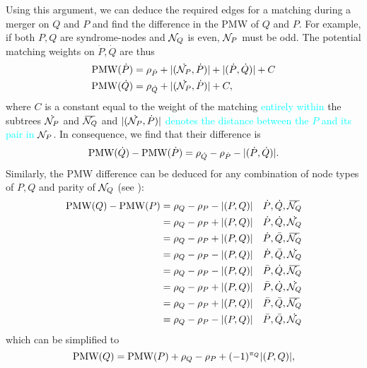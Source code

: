 Using this argument, we can deduce the required edges for a matching during a merger on $Q$ and $P$ and find the difference in the PMW of $Q$ and $P$. For example, if both $P,Q$ are syndrome-nodes and $\mathcal{N}_Q$ is even, $\mathcal{N}_P$ must be odd. The potential matching weights on $\dot{P},\dot{Q}$ are thus 
\begin{align*}
  \text{PMW}(\dot{P}) &= \rho_{\dot{P}} + \lvert(\dot{\mathcal{N}_P},\dot{P})\rvert + \lvert(\dot{P}, \dot{Q})\rvert + C \\
  \text{PMW}(\dot{Q}) &= \rho_{\dot{Q}} + \lvert(\dot{\mathcal{N}_P},\dot{P})\rvert + C,
\end{align*}
where $C$ is a constant equal to the weight of the matching \textcolor{cyan}{entirely within} the subtrees $\dot{\mathcal{N}_P}$ and $\overbar{\nset_Q}$ and \textcolor{cyan}{$\lvert(\dot{\mathcal{N}_P},\dot{P})\rvert$ denotes the distance between the $P$ and its pair in $\mathcal{N}_P$}. In consequence, we find that their difference is 
\begin{equation*}
  \text{PMW}(\dot{Q}) - \text{PMW}(\dot{P}) = \rho_{\dot{Q}} - \rho_{\dot{P}} - \lvert(\dot{P}, \dot{Q})\rvert.
\end{equation*}
Similarly, the PMW difference can be deduced for any combination of node types of $P,Q$ and parity of $\mathcal{N}_Q$ (see ):
\begin{align*}
  \text{PMW}({Q}) - \text{PMW}({P}) &= \rho_Q - \rho_P - \abs{(P,Q)}  &\dot{P}, \dot{Q}, \overbar{\nset_Q} \\
  &= \rho_Q - \rho_P + \abs{(P,Q)}  &\dot{P}, \dot{Q}, \dot{\nset_Q} \\
  &= \rho_Q - \rho_P + \abs{(P,Q)}  &\dot{P}, \bar{Q}, \overbar{\nset_Q} \\
  &= \rho_Q - \rho_P - \abs{(P,Q)}  &\dot{P}, \bar{Q}, \dot{\nset_Q} \\
  &= \rho_Q - \rho_P - \abs{(P,Q)}  &\bar{P}, \dot{Q}, \overbar{\nset_Q} \\
  &= \rho_Q - \rho_P + \abs{(P,Q)}  &\bar{P}, \dot{Q}, \dot{\nset_Q} \\
  &= \rho_Q - \rho_P + \abs{(P,Q)}  &\bar{P}, \bar{Q}, \overbar{\nset_Q} \\
  &= \rho_Q - \rho_P - \abs{(P,Q)}  &\bar{P}, \bar{Q}, \dot{\nset_Q} \\
\end{align*}
which can be simplified to 
\begin{equation}\label{eq:pmwdif}
    \text{PMW}({Q}) =  \text{PMW}({P}) + \rho_Q-\rho_P + (-1)^{\pi_Q}\lvert(P,Q)\rvert,
\end{equation}
